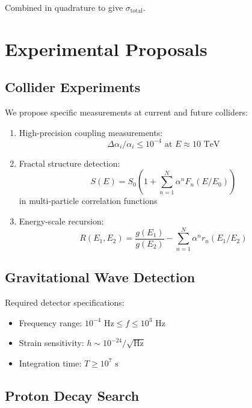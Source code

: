 \documentclass[12pt]{article}
\begin{document}
Combined in quadrature to give $\sigma_{\text{total}}$.

\section{Experimental Proposals}
\label{app:experiments}

\subsection{Collider Experiments}

We propose specific measurements at current and future colliders:

\begin{enumerate}
\item High-precision coupling measurements:
   \begin{equation}
   \Delta\alpha_i/\alpha_i \leq 10^{-4} \text{ at } E \approx 10\text{ TeV}
   \end{equation}

\item Fractal structure detection:
   \begin{equation}
   S(E) = S_0\left(1 + \sum_{n=1}^N \alpha^n F_n(E/E_0)\right)
   \end{equation}
   in multi-particle correlation functions

\item Energy-scale recursion:
   \begin{equation}
   R(E_1,E_2) = \frac{g(E_1)}{g(E_2)} - \sum_{n=1}^N \alpha^n r_n(E_1/E_2)
   \end{equation}
\end{enumerate}

\subsection{Gravitational Wave Detection}

Required detector specifications:

\begin{itemize}
\item Frequency range: $10^{-4} \text{ Hz} \leq f \leq 10^3 \text{ Hz}$
\item Strain sensitivity: $h \sim 10^{-24}/\sqrt{\text{Hz}}$
\item Integration time: $T \geq 10^7 \text{ s}$
\end{itemize}

\subsection{Proton Decay Search}
\end{document}
